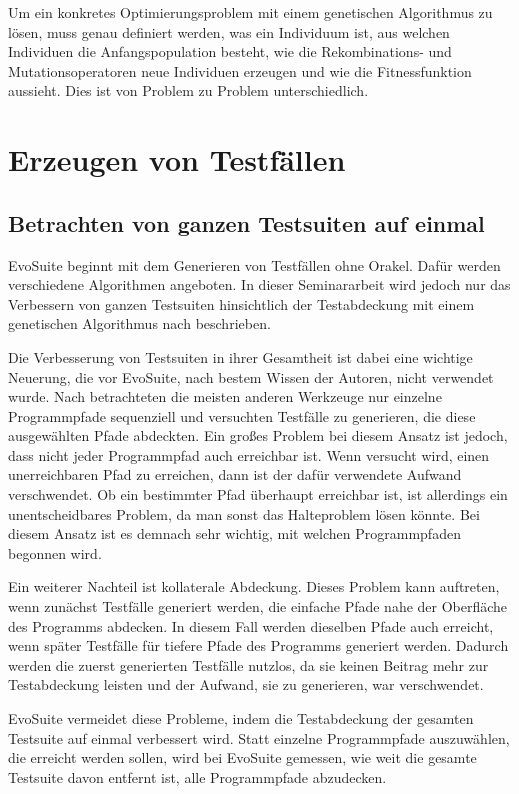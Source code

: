 \documentclass[a4paper,11pt]{article}
\begin{document}
Um ein konkretes Optimierungsproblem mit einem genetischen Algorithmus zu lösen, muss genau definiert werden, was ein Individuum ist, aus welchen Individuen die Anfangspopulation besteht, wie die Rekombinations- und Mutationsoperatoren neue Individuen erzeugen und wie die Fitnessfunktion aussieht.
Dies ist von Problem zu Problem unterschiedlich.

\section{Erzeugen von Testfällen}
\label{sec:erzeugen_von_testfaellen}

\subsection{Betrachten von ganzen Testsuiten auf einmal}

EvoSuite beginnt mit dem Generieren von Testfällen ohne Orakel.
Dafür werden verschiedene Algorithmen angeboten.
In dieser Seminararbeit wird jedoch nur das Verbessern von ganzen Testsuiten hinsichtlich der Testabdeckung mit einem genetischen Algorithmus nach \cite{TSE12_EvoSuite} beschrieben.

Die Verbesserung von Testsuiten in ihrer Gesamtheit ist dabei eine wichtige Neuerung, die vor EvoSuite, nach bestem Wissen der Autoren, nicht verwendet wurde.
Nach \cite{TSE12_EvoSuite} betrachteten die meisten anderen Werkzeuge nur einzelne Programmpfade sequenziell und versuchten Testfälle zu generieren, die diese ausgewählten Pfade abdeckten.
Ein großes Problem bei diesem Ansatz ist jedoch, dass nicht jeder Programmpfad auch erreichbar ist.
Wenn versucht wird, einen unerreichbaren Pfad zu erreichen, dann ist der dafür verwendete Aufwand verschwendet.
Ob ein bestimmter Pfad überhaupt erreichbar ist, ist allerdings ein unentscheidbares Problem, da man sonst das Halteproblem lösen könnte.
Bei diesem Ansatz ist es demnach sehr wichtig, mit welchen Programmpfaden begonnen wird.

Ein weiterer Nachteil ist kollaterale Abdeckung.
Dieses Problem kann auftreten, wenn zunächst Testfälle generiert werden, die einfache Pfade nahe der Oberfläche des Programms abdecken.
In diesem Fall werden dieselben Pfade auch erreicht, wenn später Testfälle für tiefere Pfade des Programms generiert werden.
Dadurch werden die zuerst generierten Testfälle nutzlos, da sie keinen Beitrag mehr zur Testabdeckung leisten und der Aufwand, sie zu generieren, war verschwendet.

EvoSuite vermeidet diese Probleme, indem die Testabdeckung der gesamten Testsuite auf einmal verbessert wird.
Statt einzelne Programmpfade auszuwählen, die erreicht werden sollen, wird bei EvoSuite gemessen, wie weit die gesamte Testsuite davon entfernt ist, alle Programmpfade abzudecken.
\end{document}
